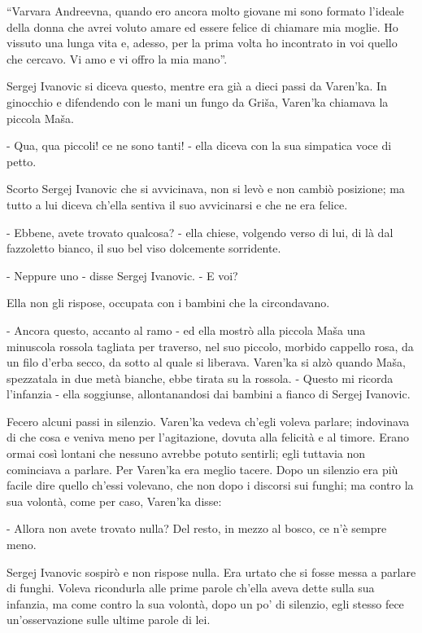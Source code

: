 ``Varvara Andreevna, quando ero ancora molto giovane mi sono formato l'ideale della donna che avrei voluto amare ed essere felice di chiamare mia moglie. Ho vissuto una lunga vita e, adesso, per la prima volta ho incontrato in voi quello che cercavo. Vi amo e vi offro la mia mano''. 

Sergej Ivanovic si diceva questo, mentre era già a dieci passi da Varen'ka. In ginocchio e difendendo con le mani un fungo da Griša, Varen'ka chiamava la piccola Maša. 

- Qua, qua piccoli! ce ne sono tanti! - ella diceva con la sua simpatica voce di petto. 

Scorto Sergej Ivanovic che si avvicinava, non si levò e non cambiò posizione; ma tutto a lui diceva ch'ella sentiva il suo avvicinarsi e che ne era felice. 

- Ebbene, avete trovato qualcosa? - ella chiese, volgendo verso di lui, di là dal fazzoletto bianco, il suo bel viso dolcemente sorridente. 

- Neppure uno - disse Sergej Ivanovic. - E voi? 

Ella non gli rispose, occupata con i bambini che la circondavano. 

- Ancora questo, accanto al ramo - ed ella mostrò alla piccola Maša una minuscola rossola tagliata per traverso, nel suo piccolo, morbido cappello rosa, da un filo d'erba secco, da sotto al quale si liberava. Varen'ka si alzò quando Maša, spezzatala in due metà bianche, ebbe tirata su la rossola. - Questo mi ricorda l'infanzia - ella soggiunse, allontanandosi dai bambini a fianco di Sergej Ivanovic. 

Fecero alcuni passi in silenzio. Varen'ka vedeva ch'egli voleva parlare; indovinava di che cosa e veniva meno per l'agitazione, dovuta alla felicità e al timore. Erano ormai così lontani che nessuno avrebbe potuto sentirli; egli tuttavia non cominciava a parlare. Per Varen'ka era meglio tacere. Dopo un silenzio era più facile dire quello ch'essi volevano, che non dopo i discorsi sui funghi; ma contro la sua volontà, come per caso, Varen'ka disse: 

- Allora non avete trovato nulla? Del resto, in mezzo al bosco, ce n'è sempre meno. 

Sergej Ivanovic sospirò e non rispose nulla. Era urtato che si fosse messa a parlare di funghi. Voleva ricondurla alle prime parole ch'ella aveva dette sulla sua infanzia, ma come contro la sua volontà, dopo un po' di silenzio, egli stesso fece un'osservazione sulle ultime parole di lei. 

